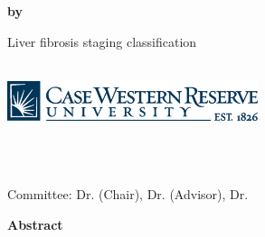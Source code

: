 \documentclass[11pt, letterpaper]{article}
\begin{document}

\begin{titlepage}
    \begin{center}
        \vspace*{0.3in}
        \Huge{\textbf{\MakeUppercase{\qetitle}}}

        \vspace{0.45in}
        \Large{\textbf{by}}
        
        \vspace{0.45in}
        \Large{\textbf{\MakeUppercase{\name}}}
        
        \vspace{0.5in}
        \Large{Liver fibrosis staging classification \\
         \
        \degreeaward}

    
        \vspace{0.75in}
        \includegraphics[width=0.55\textwidth]{fig/cwru_logo.eps} 

        \vspace{0.7in}
        \Large{\department \\
        \university \\
        \monthyeardate}
    \end{center}
\end{titlepage}


\thispagestyle{plain}
\begin{center}
    \Large
    \textbf{\qetitle}
        
    \vspace{0.13in}
    \textbf{\name}
    
    \vspace{0.13in}
    \normalsize{Committee: Dr. \chair(Chair), Dr. \advisor(Advisor), Dr. \committee}
       
    \vspace{0.3in}
    \large
    \textbf{Abstract}
\end{center}

\newpage


\tableofcontents
\newpage







{}

\newpage

{}


\newpage

{}

\end{document}
